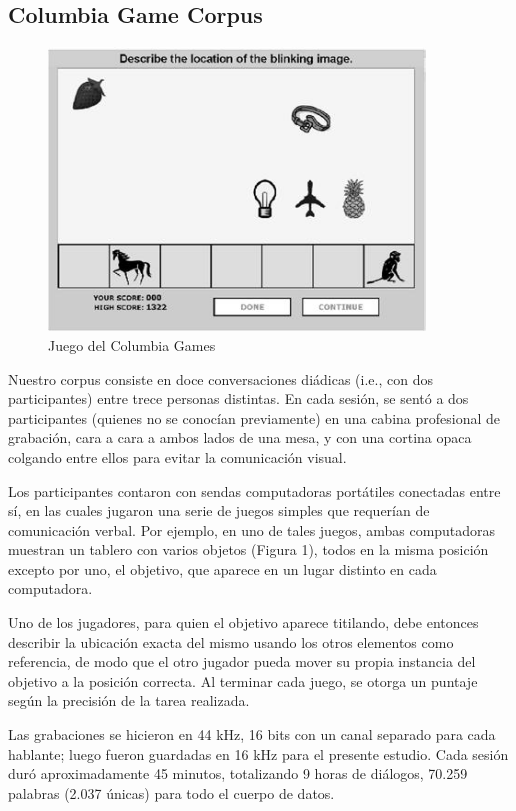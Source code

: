 \subsection{Columbia Game Corpus}

\begin{figure}
\centering
\includegraphics[width=10cm]{images/columbia_games.jpg}
\caption{Juego del Columbia Games}
\end{figure}

Nuestro corpus consiste en doce conversaciones diádicas (i.e., con dos participantes) entre trece personas distintas. En cada sesión, se sentó a dos participantes (quienes no se conocían previamente) en una cabina profesional de grabación, cara a cara a ambos lados de una mesa, y con una cortina opaca colgando entre ellos para evitar la comunicación visual.

Los participantes contaron con sendas computadoras portátiles conectadas entre sí, en las cuales jugaron una serie de juegos simples que requerían de comunicación verbal. Por ejemplo, en uno de tales juegos, ambas computadoras muestran un tablero con varios objetos (Figura 1), todos en la misma posición excepto por uno, el objetivo, que aparece en un lugar distinto en cada computadora.

Uno de los jugadores, para quien el objetivo aparece titilando, debe entonces describir la ubicación exacta del mismo usando los
otros elementos como referencia, de modo que el otro jugador pueda mover su propia instancia del objetivo a la posición correcta. Al terminar cada juego, se otorga un puntaje según la precisión de la tarea realizada.

Las grabaciones se hicieron en 44 kHz, 16 bits con un canal separado para cada hablante; luego fueron guardadas en 16 kHz para el presente estudio. Cada sesión duró aproximadamente 45 minutos, totalizando 9 horas de diálogos, 70.259 palabras (2.037 únicas) para todo el cuerpo de datos.
